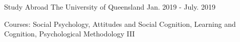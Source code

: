 \begin{cventries}
   \cventry
    {Study Abroad} %
    {The University of Queensland} %
    {Jan. 2019 - July. 2019} %
    {} %
    {
      \begin{cvitems} %
        \item {Courses: Social Psychology, Attitudes and Social Cognition, Learning and Cognition, Psychological Methodology III}
     \end{cvitems}
    }

\end{cventries}
